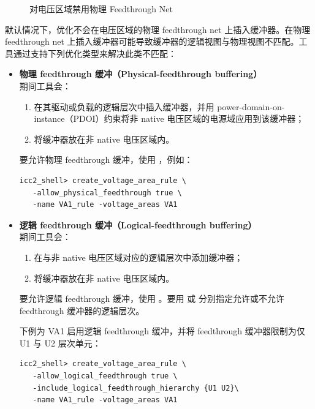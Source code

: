 \begin{figure}[htbp]
\centering
{}
\caption{对电压区域禁用物理 Feedthrough Net}
\label{fig:phys-ft-off}
\end{figure}

默认情况下，优化不会在电压区域的物理 feedthrough net 上插入缓冲器。在物理 feedthrough net 上插入缓冲器可能导致缓冲器的逻辑视图与物理视图不匹配。工具通过支持下列优化类型来解决此类不匹配：
\begin{itemize}
  \item \textbf{物理 feedthrough 缓冲（Physical-feedthrough buffering）}\\
    期间工具会：
    \begin{enumerate}
      \item 在其驱动或负载的逻辑层次中插入缓冲器，并用 power-domain-on-instance（PDOI）约束将非 native 电压区域的电源域应用到该缓冲器；
      \item 将缓冲器放在非 native 电压区域内。
    \end{enumerate}
    要允许物理 feedthrough 缓冲，使用 ，例如：
\begin{lstlisting}
icc2_shell> create_voltage_area_rule \
   -allow_physical_feedthrough true \
   -name VA1_rule -voltage_areas VA1
\end{lstlisting}

  \item \textbf{逻辑 feedthrough 缓冲（Logical-feedthrough buffering）}\\
    期间工具会：
    \begin{enumerate}
      \item 在与非 native 电压区域对应的逻辑层次中添加缓冲器；
      \item 将缓冲器放在非 native 电压区域内。
    \end{enumerate}
    要允许逻辑 feedthrough 缓冲，使用 。要用  或  分别指定允许或不允许 feedthrough 缓冲器的逻辑层次。

    下例为 VA1 启用逻辑 feedthrough 缓冲，并将 feedthrough 缓冲器限制为仅 U1 与 U2 层次单元：
\begin{lstlisting}
icc2_shell> create_voltage_area_rule \
   -allow_logical_feedthrough true \
   -include_logical_feedthrough_hierarchy {U1 U2}\
   -name VA1_rule -voltage_areas VA1
\end{lstlisting}


\end{itemize}
